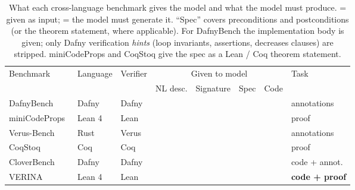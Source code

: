 \begin{table}[t]
\centering
\small
\setlength{\tabcolsep}{6pt}
\renewcommand{\arraystretch}{1.15}
\caption{What each cross-language benchmark gives the model and what the model must produce. \cmark{} = given as input; \xmark{} = the model must generate it. ``Spec'' covers preconditions and postconditions (or the theorem statement, where applicable). For DafnyBench the implementation body is given; only Dafny verification \emph{hints} (loop invariants, assertions, decreases clauses) are stripped. miniCodeProps and CoqStoq give the spec as a Lean / Coq theorem statement.}
\label{tab:bench-modalities}
\providecommand{\cmark}{\ding{51}}
\providecommand{\xmark}{\ding{55}}
\begin{tabular}{lllccccl}
\toprule
\multirow{2}{*}{Benchmark} & \multirow{2}{*}{Language} & \multirow{2}{*}{Verifier} & \multicolumn{4}{c}{Given to model} & \multirow{2}{*}{Task} \\
\cmidrule(lr){4-7}
& & & NL desc. & Signature & Spec & Code & \\
\midrule
DafnyBench~\cite{dafnybench}    & Dafny       & Dafny     & \xmark & \cmark & \cmark & \cmark & annotations \\
miniCodeProps~\cite{minicodeprops} & Lean 4   & Lean      & \xmark & \cmark & \cmark & \cmark & proof \\
Verus-Bench~\cite{autoverus}    & Rust        & Verus     & \xmark & \cmark & \cmark & \cmark & annotations \\
CoqStoq~\cite{rango}            & Coq         & Coq       & \xmark & \cmark & \cmark & \cmark & proof \\
CloverBench~\cite{clover}       & Dafny       & Dafny     & \cmark & \cmark & \cmark & \xmark & code + annot. \\
{VERINA}~\cite{verina}  & Lean 4 & Lean & \cmark & \cmark & \cmark & \xmark & \textbf{code + proof} \\
\bottomrule
\end{tabular}
\end{table}
